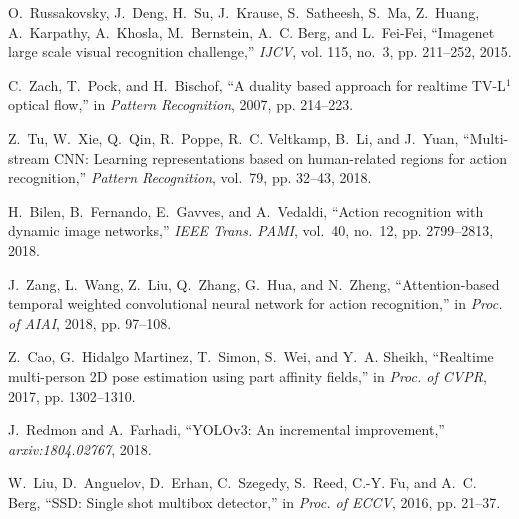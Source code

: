 \documentclass[journal]{IEEEtran}
\begin{document}
\begin{thebibliography}{10}
	O.~Russakovsky, J.~Deng, H.~Su, J.~Krause, S.~Satheesh, S.~Ma, Z.~Huang,
	A.~Karpathy, A.~Khosla, M.~Bernstein, A.~C. Berg, and L.~Fei-Fei, ``Imagenet
	large scale visual recognition challenge,'' \emph{IJCV}, vol. 115, no.~3, pp.
	211--252, 2015.
	
	C.~Zach, T.~Pock, and H.~Bischof, ``A duality based approach for realtime
	{TV-L}$^1$ optical flow,'' in \emph{Pattern Recognition}, 2007, pp. 214--223.
	
	Z.~Tu, W.~Xie, Q.~Qin, R.~Poppe, R.~C. Veltkamp, B.~Li, and J.~Yuan,
	``Multi-stream {CNN}: Learning representations based on human-related regions
	for action recognition,'' \emph{Pattern Recognition}, vol.~79, pp. 32--43,
	2018.
	
	H.~{Bilen}, B.~{Fernando}, E.~{Gavves}, and A.~{Vedaldi}, ``Action recognition
	with dynamic image networks,'' \emph{IEEE Trans. PAMI}, vol.~40, no.~12, pp.
	2799--2813, 2018.
	
	J.~Zang, L.~Wang, Z.~Liu, Q.~Zhang, G.~Hua, and N.~Zheng, ``Attention-based
	temporal weighted convolutional neural network for action recognition,'' in
	\emph{Proc. of AIAI}, 2018, pp. 97--108.
	
	Z.~{Cao}, G.~{Hidalgo Martinez}, T.~{Simon}, S.~{Wei}, and Y.~A. {Sheikh},
	``Realtime multi-person {2D} pose estimation using part affinity fields,'' in
	\emph{Proc. of CVPR}, 2017, pp. 1302--1310.
	
	J.~Redmon and A.~Farhadi, ``{YOLO}v3: An incremental improvement,''
	\emph{arxiv:1804.02767}, 2018.
	
	W.~Liu, D.~Anguelov, D.~Erhan, C.~Szegedy, S.~Reed, C.-Y. Fu, and A.~C. Berg,
	``{SSD}: Single shot multibox detector,'' in \emph{Proc. of ECCV}, 2016, pp.
	21--37.
	
\end{thebibliography}
\end{document}
